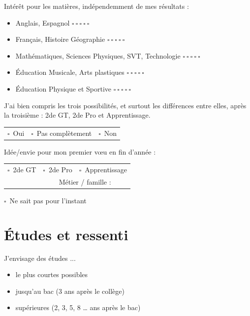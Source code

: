 \documentclass[11pt,a5paper]{article}
\newcommand{\checkbox}{\(\square\)}
\newcommand{\choix}[1]{\checkbox\ #1}
\newcommand{\ligne}{{\color{gray!60}\hrulefill}}
\begin{document}
\vspace{0.6em}
Intérêt pour les matières, indépendemment de mes résultats :

\newcommand{\avis}{\hfill \(\square\ \square\ \square\ \square\ \square\)}
\begin{itemize}[topsep=0pt]
  \item Anglais, Espagnol \avis
  \item Français, Histoire Géographie \avis
  \item Mathématiques, Sciences Physiques, SVT, Technologie \avis
  \item Éducation Musicale, Arts plastiques \avis
  \item Éducation Physique et Sportive \avis
\end{itemize}
\newpage
J'ai bien compris les trois possibilités, et surtout les différences entre elles, après la troisième : 2de GT, 2de Pro et Apprentissage.

\vspace{0.6em}
\begin{tabularx}{\textwidth}{Y Y Y}
\choix{Oui} & \choix{Pas complètement} & \choix{Non}
\end{tabularx}

\vspace{1.6em}
Idée/envie pour mon premier vœu en fin d'année :

\vspace{0.4em}
\begin{tabularx}{\textwidth}{Y | Y Y}
\choix{2de GT} & \choix{2de Pro} & \choix{Apprentissage}\\
[0.4em]
& \multicolumn{2}{c}{Métier / famille : \ligne }
\end{tabularx}
\begin{center}
\choix{Ne sait pas pour l'instant}
\end{center}

\section*{Études et ressenti}

J'envisage des études ...

\begin{itemize}[label=\square, topsep=0pt]
\item le plus courtes possibles
\item jusqu'au bac (3 ans après le collège)
\item supérieures (2, 3, 5, 8 … ans après le bac)
\end{itemize}
\end{document}
